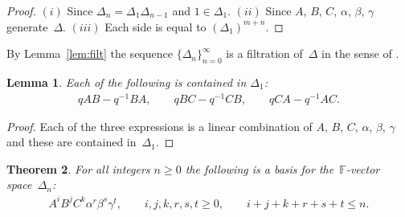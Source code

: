 \documentclass[pdftex]{sigma}
\numberwithin{equation}{section}
\newtheorem{Theorem}{Theorem}[section]
\newtheorem{Lemma}[Theorem]{Lemma}
\begin{document}
\begin{proof}
$(i)$ Since $\Delta_n=\Delta_1 \Delta_{n-1}$
and $1 \in \Delta_1$.
$(ii)$ Since $A$, $B$, $C$, $\alpha$, $\beta$, $\gamma $ generate~$\Delta$.
$(iii)$ Each side is equal to
$(\Delta_1)^{m+n}$.
\end{proof}

By Lemma~\ref{lem:filt} the sequence
$\lbrace \Delta_n\rbrace_{n=0}^\infty$ is a f\/iltration of~$\Delta$ in the sense of
\cite[p.~202]{carter}.


\begin{Lemma}
\label{lem:almostcom}
Each of the following is contained in $\Delta_1$:
\begin{gather*}
qAB-q^{-1}BA,
\qquad
qBC-q^{-1}CB,
\qquad
qCA-q^{-1}AC.
\end{gather*}
\end{Lemma}

\begin{proof}
Each of the three expressions is a linear combination of
$A$, $B$, $C$, $\alpha$, $\beta$, $\gamma$ and these are contained in~$\Delta_1$.
\end{proof}

\begin{Theorem}\label{lem:unbasis}
For all integers $n\geq 0$ the following is
a basis for the~$\mathbb F$-vector space~$\Delta_n$:
\begin{gather}
\label{eq:basislist}
A^iB^jC^k\alpha^r \beta^s \gamma^t, \qquad
i,j,k,r,s,t\geq 0, \qquad
i+j+k+r+s+t \leq n.
\end{gather}
\end{Theorem}
\end{document}

